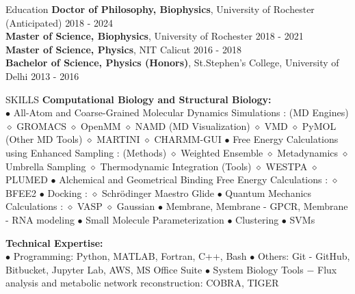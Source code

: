 \documentclass{resume} %
\begin{document}

\begin{rSection}{Education}
   {\bf Doctor of Philosophy, Biophysics}, University of Rochester (Anticipated) \hfill {2018 - 2024}\\
   {\bf Master of Science, Biophysics}, University of Rochester \hfill {2018 - 2021}\\
   {\bf Master of Science, Physics}, NIT Calicut \hfill {2016 - 2018}\\
   {\bf Bachelor of Science, Physics (Honors)}, St.Stephen's College, University of Delhi \hfill {2013 - 2016}


\end{rSection}


\begin{rSection}{SKILLS}
   {\bf Computational Biology and Structural Biology:} \\
   $\bullet$ All-Atom and Coarse-Grained Molecular Dynamics Simulations :
   (MD Engines)   \textsf{$\diamond$ GROMACS $\diamond$ OpenMM $\diamond$ NAMD}
   (MD Visualization)  \textsf{$\diamond$ VMD $\diamond$ PyMOL}
   (Other MD Tools) \textsf{$\diamond$ MARTINI $\diamond$ CHARMM-GUI}
   $\bullet$ Free Energy Calculations using Enhanced Sampling :
   (Methods) $\diamond$ Weighted Ensemble $\diamond$ Metadynamics $\diamond$ Umbrella Sampling $\diamond$ Thermodynamic Integration
   (Tools) \textsf{$\diamond$ WESTPA $\diamond$ PLUMED}
   $\bullet$ Alchemical and Geometrical Binding Free Energy Calculations :
   $\diamond$ \textsf{BFEE2}
   $\bullet$ Docking :
   $\diamond$ \textsf{Schrödinger Maestro Glide}
   $\bullet$ Quantum Mechanics Calculations :
   \textsf{$\diamond$ VASP $\diamond$ Gaussian}
   $\bullet$ Membrane, Membrane - GPCR, Membrane - RNA modeling $\bullet$ Small Molecule Parameterization  $\bullet$ Clustering $\bullet$ SVMs

      {\bf Technical Expertise:} \\
   $\bullet$ Programming: \textsf{Python, MATLAB, Fortran, C++, Bash} $\bullet$
   Others: \textsf{Git - GitHub, Bitbucket, Jupyter Lab, AWS, MS Office Suite} $\bullet$
   System Biology Tools $-$  Flux analysis and metabolic network reconstruction: \textsf{COBRA, TIGER}

\end{rSection}
\end{document}
